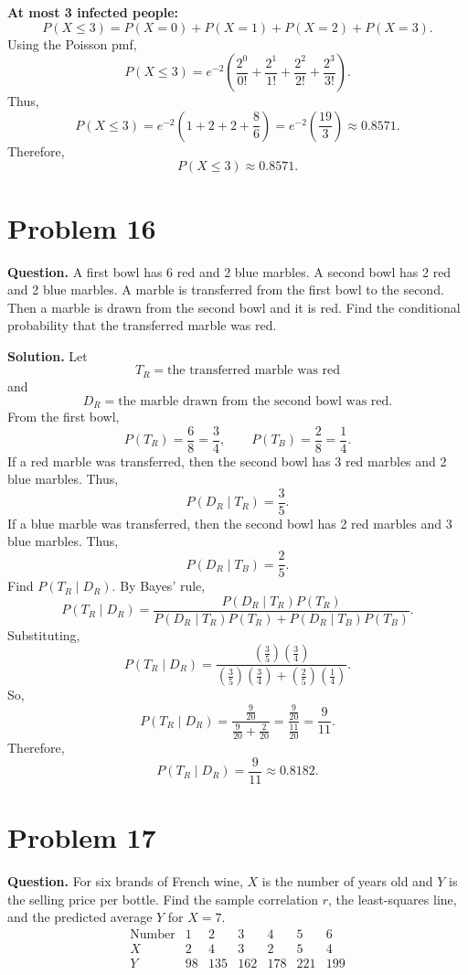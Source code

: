 \documentclass[11pt]{article}
\begin{document}
\textbf{At most 3 infected people:}
\[
P(X\le 3)=P(X=0)+P(X=1)+P(X=2)+P(X=3).
\]
Using the Poisson pmf,
\[
P(X\le 3)=e^{-2}\left(\frac{2^0}{0!}+\frac{2^1}{1!}+\frac{2^2}{2!}+\frac{2^3}{3!}\right).
\]
Thus,
\[
P(X\le 3)=e^{-2}\left(1+2+2+\frac{8}{6}\right)=e^{-2}\left(\frac{19}{3}\right)\approx 0.8571.
\]
Therefore,
\[
\boxed{P(X\le 3)\approx 0.8571}.
\]

\newpage
\section*{Problem 16}

\textbf{Question.} A first bowl has 6 red and 2 blue marbles. A second bowl has 2 red and 2 blue marbles. A marble is transferred from the first bowl to the second. Then a marble is drawn from the second bowl and it is red. Find the conditional probability that the transferred marble was red.

\textbf{Solution.} Let
\[
T_R=\text{the transferred marble was red}
\]
and
\[
D_R=\text{the marble drawn from the second bowl was red}.
\]
From the first bowl,
\[
P(T_R)=\frac{6}{8}=\frac{3}{4}, \qquad P(T_B)=\frac{2}{8}=\frac{1}{4}.
\]
If a red marble was transferred, then the second bowl has 3 red marbles and 2 blue marbles. Thus,
\[
P(D_R\mid T_R)=\frac{3}{5}.
\]
If a blue marble was transferred, then the second bowl has 2 red marbles and 3 blue marbles. Thus,
\[
P(D_R\mid T_B)=\frac{2}{5}.
\]
Find $P(T_R\mid D_R)$. By Bayes' rule,
\[
P(T_R\mid D_R)=\frac{P(D_R\mid T_R)P(T_R)}{P(D_R\mid T_R)P(T_R)+P(D_R\mid T_B)P(T_B)}.
\]
Substituting,
\[
P(T_R\mid D_R)=\frac{\left(\frac{3}{5}\right)\left(\frac{3}{4}\right)}{\left(\frac{3}{5}\right)\left(\frac{3}{4}\right)+\left(\frac{2}{5}\right)\left(\frac{1}{4}\right)}.
\]
So,
\[
P(T_R\mid D_R)=\frac{\frac{9}{20}}{\frac{9}{20}+\frac{2}{20}}=\frac{\frac{9}{20}}{\frac{11}{20}}=\frac{9}{11}.
\]
Therefore,
\[
\boxed{P(T_R\mid D_R)=\frac{9}{11}\approx 0.8182}.
\]

\newpage
\section*{Problem 17}

\textbf{Question.} For six brands of French wine, $X$ is the number of years old and $Y$ is the selling price per bottle. Find the sample correlation $r$, the least-squares line, and the predicted average $Y$ for $X=7$.
\[
\begin{array}{c|cccccc}
\text{Number} & 1 & 2 & 3 & 4 & 5 & 6\\
\hline
X & 2 & 4 & 3 & 2 & 5 & 4\\
Y & 98 & 135 & 162 & 178 & 221 & 199
\end{array}
\]
\end{document}
